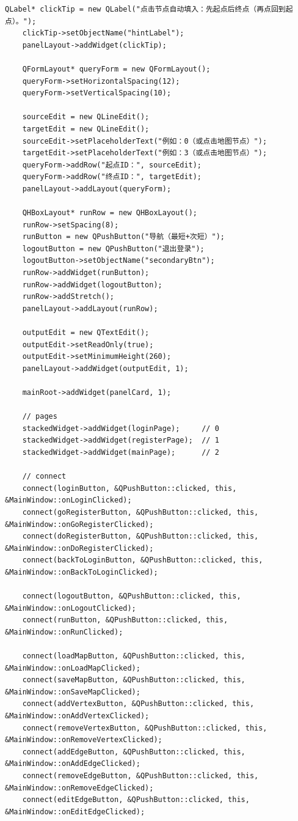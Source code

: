 \documentclass[UTF8,12pt,a4paper]{ctexart}
\begin{document}
\begin{lstlisting}[caption={mainwindow.cpp 源码}]
    QLabel* clickTip = new QLabel("点击节点自动填入：先起点后终点（再点回到起点）。");
    clickTip->setObjectName("hintLabel");
    panelLayout->addWidget(clickTip);

    QFormLayout* queryForm = new QFormLayout();
    queryForm->setHorizontalSpacing(12);
    queryForm->setVerticalSpacing(10);

    sourceEdit = new QLineEdit();
    targetEdit = new QLineEdit();
    sourceEdit->setPlaceholderText("例如：0（或点击地图节点）");
    targetEdit->setPlaceholderText("例如：3（或点击地图节点）");
    queryForm->addRow("起点ID：", sourceEdit);
    queryForm->addRow("终点ID：", targetEdit);
    panelLayout->addLayout(queryForm);

    QHBoxLayout* runRow = new QHBoxLayout();
    runRow->setSpacing(8);
    runButton = new QPushButton("导航（最短+次短）");
    logoutButton = new QPushButton("退出登录");
    logoutButton->setObjectName("secondaryBtn");
    runRow->addWidget(runButton);
    runRow->addWidget(logoutButton);
    runRow->addStretch();
    panelLayout->addLayout(runRow);

    outputEdit = new QTextEdit();
    outputEdit->setReadOnly(true);
    outputEdit->setMinimumHeight(260);
    panelLayout->addWidget(outputEdit, 1);

    mainRoot->addWidget(panelCard, 1);

    // pages
    stackedWidget->addWidget(loginPage);     // 0
    stackedWidget->addWidget(registerPage);  // 1
    stackedWidget->addWidget(mainPage);      // 2

    // connect
    connect(loginButton, &QPushButton::clicked, this, &MainWindow::onLoginClicked);
    connect(goRegisterButton, &QPushButton::clicked, this, &MainWindow::onGoRegisterClicked);
    connect(doRegisterButton, &QPushButton::clicked, this, &MainWindow::onDoRegisterClicked);
    connect(backToLoginButton, &QPushButton::clicked, this, &MainWindow::onBackToLoginClicked);

    connect(logoutButton, &QPushButton::clicked, this, &MainWindow::onLogoutClicked);
    connect(runButton, &QPushButton::clicked, this, &MainWindow::onRunClicked);

    connect(loadMapButton, &QPushButton::clicked, this, &MainWindow::onLoadMapClicked);
    connect(saveMapButton, &QPushButton::clicked, this, &MainWindow::onSaveMapClicked);
    connect(addVertexButton, &QPushButton::clicked, this, &MainWindow::onAddVertexClicked);
    connect(removeVertexButton, &QPushButton::clicked, this, &MainWindow::onRemoveVertexClicked);
    connect(addEdgeButton, &QPushButton::clicked, this, &MainWindow::onAddEdgeClicked);
    connect(removeEdgeButton, &QPushButton::clicked, this, &MainWindow::onRemoveEdgeClicked);
    connect(editEdgeButton, &QPushButton::clicked, this, &MainWindow::onEditEdgeClicked);


\end{lstlisting}
\end{document}
